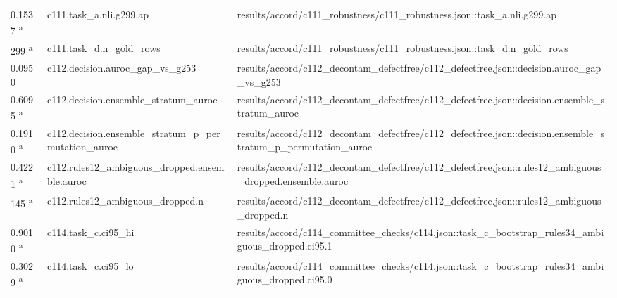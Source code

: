 \begin{longtable}{@{}p{0.7in}p{1.9in}p{2.6in}@{}}
0.1537 \textsuperscript{a} & c111.\allowbreak{}task\_a.\allowbreak{}nli.\allowbreak{}g299.\allowbreak{}ap & results/\allowbreak{}accord/\allowbreak{}c111\_robustness/\allowbreak{}c111\_robustness.\allowbreak{}json::task\_a.\allowbreak{}nli.\allowbreak{}g299.\allowbreak{}ap\\
299 \textsuperscript{a} & c111.\allowbreak{}task\_d.\allowbreak{}n\_gold\_rows & results/\allowbreak{}accord/\allowbreak{}c111\_robustness/\allowbreak{}c111\_robustness.\allowbreak{}json::task\_d.\allowbreak{}n\_gold\_rows\\
0.0950 & c112.\allowbreak{}decision.\allowbreak{}auroc\_gap\_vs\_g253 & results/\allowbreak{}accord/\allowbreak{}c112\_decontam\_defectfree/\allowbreak{}c112\_defectfree.\allowbreak{}json::decision.\allowbreak{}auroc\_gap\_vs\_g253\\
0.6095 \textsuperscript{a} & c112.\allowbreak{}decision.\allowbreak{}ensemble\_stratum\_auroc & results/\allowbreak{}accord/\allowbreak{}c112\_decontam\_defectfree/\allowbreak{}c112\_defectfree.\allowbreak{}json::decision.\allowbreak{}ensemble\_stratum\_auroc\\
0.1910 \textsuperscript{a} & c112.\allowbreak{}decision.\allowbreak{}ensemble\_stratum\_p\_permutation\_auroc & results/\allowbreak{}accord/\allowbreak{}c112\_decontam\_defectfree/\allowbreak{}c112\_defectfree.\allowbreak{}json::decision.\allowbreak{}ensemble\_stratum\_p\_permutation\_auroc\\
0.4221 \textsuperscript{a} & c112.\allowbreak{}rules12\_ambiguous\_dropped.\allowbreak{}ensemble.\allowbreak{}auroc & results/\allowbreak{}accord/\allowbreak{}c112\_decontam\_defectfree/\allowbreak{}c112\_defectfree.\allowbreak{}json::rules12\_ambiguous\_dropped.\allowbreak{}ensemble.\allowbreak{}auroc\\
145 \textsuperscript{a} & c112.\allowbreak{}rules12\_ambiguous\_dropped.\allowbreak{}n & results/\allowbreak{}accord/\allowbreak{}c112\_decontam\_defectfree/\allowbreak{}c112\_defectfree.\allowbreak{}json::rules12\_ambiguous\_dropped.\allowbreak{}n\\
0.9010 \textsuperscript{a} & c114.\allowbreak{}task\_c.\allowbreak{}ci95\_hi & results/\allowbreak{}accord/\allowbreak{}c114\_committee\_checks/\allowbreak{}c114.\allowbreak{}json::task\_c\_bootstrap\_rules34\_ambiguous\_dropped.\allowbreak{}ci95.\allowbreak{}1\\
0.3029 \textsuperscript{a} & c114.\allowbreak{}task\_c.\allowbreak{}ci95\_lo & results/\allowbreak{}accord/\allowbreak{}c114\_committee\_checks/\allowbreak{}c114.\allowbreak{}json::task\_c\_bootstrap\_rules34\_ambiguous\_dropped.\allowbreak{}ci95.\allowbreak{}0\\

\end{longtable}
